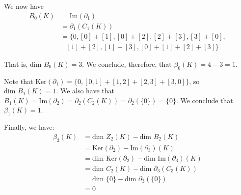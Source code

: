 \documentclass{article}
\begin{document}
    We now have
    \begin{align*}
        B_0(K) &= \textrm{Im}(\partial_1) \\
        &= \partial_1(C_1(K)) \\
        &= \{0, [0]+[1], [0]+[2], [2]+[3], [3]+[0], \\
        & \ \ \ \ [1]+[2], [1]+[3], [0]+[1]+[2]+[3]\}
    \end{align*}
    
    That is, $\textrm{dim } B_0(K) = 3$.
    We conclude, therefore, that $\beta_0(K) = 4 - 3 = 1$.

    Note that $\textrm{Ker}(\partial_1) = \{0, [0, 1]+[1, 2]+[2, 3]+[3, 0]\}$, so $\textrm{dim } B_1(K) = 1$. We also have that $B_1(K) = \textrm{Im}(\partial_2) = \partial_2(C_2(K)) = \partial_2(\{0\}) = \{0\}$.
    We conclude that $\beta_1(K) = 1$.

    Finally, we have:
    \begin{align*}
        \beta_2(K) &= \textrm{dim }Z_2(K) - \textrm{dim }B_2(K) \\
        &= \textrm{Ker}(\partial_2) - \textrm{Im}(\partial_3)(K) \\
        &= \textrm{dim Ker}(\partial_2) - \textrm{dim Im}(\partial_3)(K) \\
        &= \textrm{dim }C_2(K) - \textrm{dim }\partial_3(C_3(K)) \\
        &= \textrm{dim }\{0\} - \textrm{dim }\partial_3(\{0\}) \\
        &= 0
    \end{align*}
\end{document}

